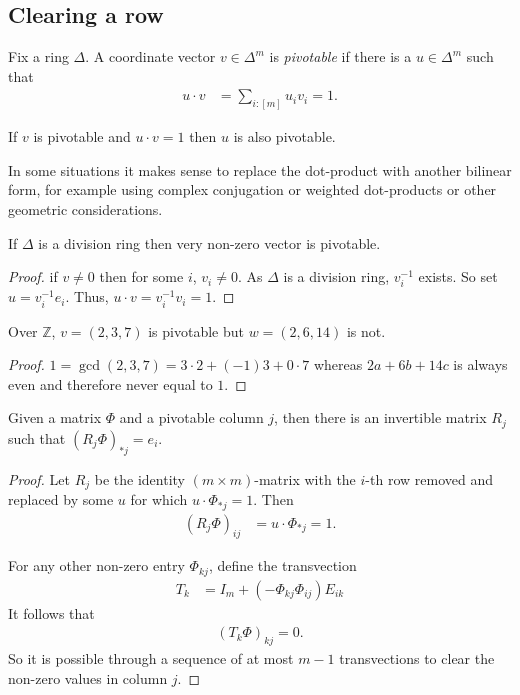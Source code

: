 \documentclass[12pt,twoside,dvipsnames,letterpaper]{memoir}
\begin{document}
\subsection{Clearing a row}

\begin{definition}
    Fix a ring $\Delta$.
    A coordinate vector $v\in \Delta^m$ is \emph{pivotable}
    if there is a $u\in \Delta^m$ such that 
    \begin{align*}
        u\cdot v & = \sum_{i:[m]} u_i v_i  = 1.
    \end{align*}
\end{definition}

\begin{proposition}
    If $v$ is pivotable and $u\cdot v=1$ then $u$ is also pivotable.
\end{proposition}

In some situations it makes sense to replace the dot-product 
with another bilinear form, for example using complex conjugation
or weighted dot-products or other geometric considerations.

\begin{proposition}
    If $\Delta$ is a division ring then very non-zero vector is pivotable.    
\end{proposition}
\begin{proof}
    if $v\neq 0$ then for some $i$, $v_i\neq 0$.  As $\Delta$ is a division 
    ring, $v_i^{-1}$ exists.  So set $u=v_i^{-1} e_i$. Thus, 
    $u\cdot v=v_i^{-1} v_i=1$.
\end{proof}

\begin{example}
    Over $\mathbb{Z}$, $v=(2,3,7)$ is pivotable but $w=(2,6,14)$ is not.
\end{example}
\begin{proof}
    $1=\gcd(2,3,7)=3\cdot 2+(-1)3+0\cdot 7$ whereas 
    $2a+6b+14c$ is always even and therefore never equal to $1$.
\end{proof}

\begin{proposition}
    Given a matrix $\Phi$ and a pivotable column $j$, 
    then there is an invertible matrix $R_j$ such that $(R_j\Phi)_{*j}=e_i$.
\end{proposition}
\begin{proof}
    Let $R_j$ be the identity $(m\times m)$-matrix with the $i$-th row removed 
    and replaced by some $u$ for which $u\cdot \Phi_{*j}=1$.
    Then 
    \begin{align*}
        (R_j \Phi)_{ij} & = u\cdot \Phi_{*j}=1.
    \end{align*}

    For any other non-zero entry $\Phi_{kj}$, define the transvection 
    \begin{align*}
        T_k & = I_m + (-\Phi_{kj}\Phi_{ij})E_{ik}
    \end{align*}
    It follows that 
    \begin{align*}
        (T_k \Phi)_{kj} = 0.
    \end{align*}
    So it is possible through a sequence of at most $m-1$ transvections 
    to clear the non-zero values in column $j$.
\end{proof}
\end{document}
